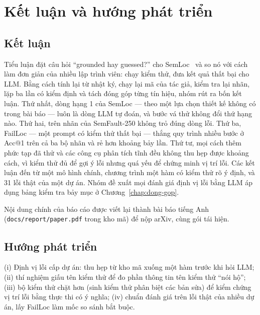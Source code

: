 \chapter{Kết luận và hướng phát triển}
\label{chap:ket-luan}

\section{Kết luận}
\label{sec:ket-luan}

Tiểu luận đặt câu hỏi ``grounded hay guessed?'' cho SemLoc~\cite{yang2026semloc} và so nó với cách làm đơn giản của nhiều
lập trình viên: chạy kiểm thử, đưa kết quả thất bại cho LLM. Bằng cách tính lại từ nhật ký, chạy lại mã của tác giả, kiểm
tra lại nhãn, lặp ba lần có kiểm định và tách đóng góp từng tín hiệu, nhóm rút ra bốn kết luận. Thứ nhất, dòng hạng 1 của
SemLoc --- theo một lựa chọn thiết kế không có trong bài báo --- luôn là dòng LLM tự đoán, và bước vá thử không đổi thứ hạng
nào. Thứ hai, \LabaudAllMoved{} trên \LabaudAllN{} nhãn của SemFault-250 không trỏ đúng dòng lỗi. Thứ ba, FailLoc --- một
prompt có kiểm thử thất bại --- thắng quy trình nhiều bước ở Acc@1 trên cả ba bộ nhãn và rẻ hơn khoảng bảy lần. Thứ tư, mọi
cách thêm phức tạp đã thử và các công cụ phân tích tĩnh đều không thu hẹp được khoảng cách, vì kiểm thử đủ để gợi ý lỗi
nhưng quá yếu để chứng minh vị trí lỗi. Các kết luận đến từ một mô hình chính, chương trình một hàm có kiểm thử rõ ý định,
và 31 lỗi thật của một dự án. Nhóm đề xuất mọi đánh giá định vị lỗi bằng LLM áp dụng bảng kiểm tra bảy mục ở
Chương~\ref{chap:dong-gop}.

Nội dung chính của báo cáo được viết lại thành bài báo tiếng Anh (\texttt{docs/report/paper.pdf} trong kho mã) để
nộp arXiv, cùng gói tái hiện.

\section{Hướng phát triển}
\label{sec:huong-phat-trien}

(i) Định vị lỗi cấp dự án: thu hẹp từ kho mã xuống một hàm trước khi hỏi LLM; (ii) thí nghiệm giấu tên kiểm thử để đo phần
thông tin tên kiểm thử ``nói hộ''; (iii) bộ kiểm thử chặt hơn (sinh kiểm thử phân biệt các bản sửa) để kiểm chứng vị trí lỗi
bằng thực thi có ý nghĩa; (iv) chuẩn đánh giá trên lỗi thật của nhiều dự án, lấy FailLoc làm mốc so sánh bắt buộc.
